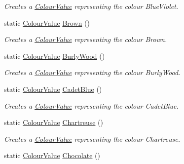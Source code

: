 \begin{DoxyCompactItemize}
\begin{DoxyCompactList}\small\item\em Creates a \hyperlink{classMezzanine_1_1ColourValue}{ColourValue} representing the colour BlueViolet. \item\end{DoxyCompactList}\item 
static \hyperlink{classMezzanine_1_1ColourValue}{ColourValue} \hyperlink{classMezzanine_1_1ColourValue_abba4255859e8f1386f3dd9a862eb5382}{Brown} ()
\begin{DoxyCompactList}\small\item\em Creates a \hyperlink{classMezzanine_1_1ColourValue}{ColourValue} representing the colour Brown. \item\end{DoxyCompactList}\item 
static \hyperlink{classMezzanine_1_1ColourValue}{ColourValue} \hyperlink{classMezzanine_1_1ColourValue_a2cf6d45d1c4d672c645f5fe3e7d0181b}{BurlyWood} ()
\begin{DoxyCompactList}\small\item\em Creates a \hyperlink{classMezzanine_1_1ColourValue}{ColourValue} representing the colour BurlyWood. \item\end{DoxyCompactList}\item 
static \hyperlink{classMezzanine_1_1ColourValue}{ColourValue} \hyperlink{classMezzanine_1_1ColourValue_a9bdbfcaa8d575f3cf9976c57f4c821da}{CadetBlue} ()
\begin{DoxyCompactList}\small\item\em Creates a \hyperlink{classMezzanine_1_1ColourValue}{ColourValue} representing the colour CadetBlue. \item\end{DoxyCompactList}\item 
static \hyperlink{classMezzanine_1_1ColourValue}{ColourValue} \hyperlink{classMezzanine_1_1ColourValue_a0f57b701da6548e0d8ae0904f2ee14c2}{Chartreuse} ()
\begin{DoxyCompactList}\small\item\em Creates a \hyperlink{classMezzanine_1_1ColourValue}{ColourValue} representing the colour Chartreuse. \item\end{DoxyCompactList}\item 
static \hyperlink{classMezzanine_1_1ColourValue}{ColourValue} \hyperlink{classMezzanine_1_1ColourValue_a274d7ef4662827aae50d6b963157cb5e}{Chocolate} ()

\end{DoxyCompactItemize}

